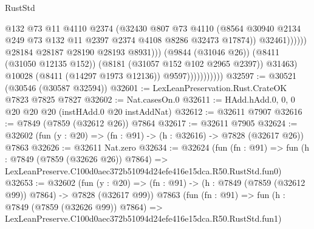 \begin{lexlean}{RustStd}
\begin{coremodule}
                                              @132
                                              @73
                                              @11
                                              @4110
                                              @2374
                                              (@32430
                                                @807
                                                @73
                                                @4110
                                                (@8564
                                                  @30940
                                                  @2134
                                                  @249
                                                  @73
                                                  @132
                                                  @11
                                                  @2397
                                                  @2374
                                                  @4108
                                                  @8286
                                                  @32473
                                                  @17874))
                                              @32461))))))
                                  @28184
                                  @28187
                                  @28190
                                  @28193
                                  @8931)))
                            (@9844 (@31046 @26))
                            (@8411 (@31050 @12135 @152))
                            (@8181 (@31057 @152 @102 @2965 @2397))
                            @31463)
                          @10028
                          (@8411 (@14297 @1973 @12136))
                          @9597)))))))))))
@32597 := @30521 (@30546 (@30587 @32594))
@32601 := LexLeanPreservation.Rust.CrateOK @7823 @7825 @7827
@32602 := Nat.casesOn.{0}
@32611 := HAdd.hAdd.{0, 0, 0} @20 @20 @20 (instHAdd.{0} @20 instAddNat)
@32612 := @32611 @7907
@32616 := @7849 (@7859 (@32612 @26)) @7864
@32617 := @32611 @7905
@32624 := @32602 (fun (y : @20) => (fn : @91) -> (h : @32616) -> @7828 (@32617 @26)) @7863
@32626 := @32611 Nat.zero
@32634 := @32624
    (fun (fn : @91) =>
    fun (h : @7849 (@7859 (@32626 @26)) @7864) =>
    LexLeanPreserve.C100d0aec372b51094d24efe416e15dca.R50.RustStd.fun0)
@32653 := @32602
    (fun (y : @20) => (fn : @91) -> (h : @7849 (@7859 (@32612 @99)) @7864) -> @7828 (@32617 @99))
    @7863
    (fun (fn : @91) =>
    fun (h : @7849 (@7859 (@32626 @99)) @7864) =>
    LexLeanPreserve.C100d0aec372b51094d24efe416e15dca.R50.RustStd.fun1)

\end{coremodule}
\end{lexlean}
